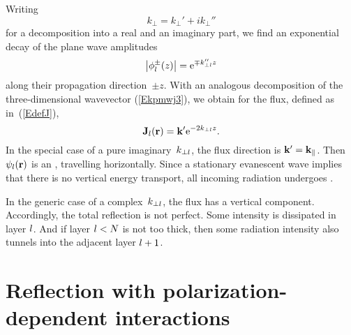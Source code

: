 Writing
\begin{equation}
  k_\perp = k_\perp' + i k_\perp''
\end{equation}
for a decomposition into a real and an imaginary part,
we find an exponential decay of the plane wave amplitudes
\begin{equation}\label{Ephidamp}
  \left|\phi^\pm_l(z)\right|
  = \text{e}^{\mp k_{\perp l}'' z}
\end{equation}
along their propagation direction~$\pm z$.
With an analogous decomposition
of the three-dimensional wavevector (\ref{Ekpmwj3}),
we obtain for the flux, defined as in~(\ref{EdefJ}),
\begin{equation}
  \mathbf{J}_l(\mathbf{r}) = \mathbf{k}' \text{e}^{-2k_{\perp l}z}.
\end{equation}
In the special case of a pure imaginary~$k_{\perp l}$,
the flux direction is $\mathbf{k}'=\mathbf{k}_\parallel$.
Then $\psi_l(\mathbf{r})$ is an ,
%
travelling horizontally.
Since a stationary evanescent wave implies that there is
no vertical energy transport,
all incoming radiation undergoes .
%

In the generic case of a complex~$k_{\perp l}$,
the flux has a vertical component.
Accordingly, the total reflection is not perfect.
Some intensity is dissipated in layer $l$.
%
And if layer $l<N$ is not too thick,
then some radiation intensity also tunnels into the adjacent layer $l+1$.
%


\section{Reflection with polarization-dependent interactions}\label{s:pol}

\MissingSection
% 
%
